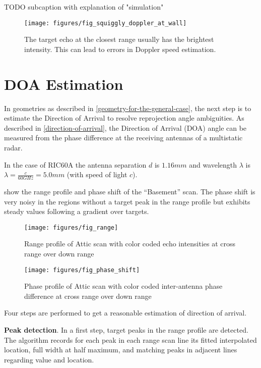 TODO subcaption with explanation of "simulation"

\begin{figure}[htbp]
    \centering
    \texttt{[image: figures/fig\_squiggly\_doppler\_at\_wall]}
    \caption{The target echo at the closest range usually has the brightest intensity. This can lead to errors in Doppler speed estimation.}
    \label{fig:fig_squiggly_doppler_at_wall}
\end{figure}

\section{DOA Estimation}\label{doa-implementation}

In geometries as described in \cref{geometry-for-the-general-case}, the next step is to estimate the Direction of Arrival to resolve reprojection angle ambiguities.
As described in \cref{direction-of-arrival}, the Direction of Arrival (DOA) angle can be measured from the phase difference at the receiving antennas of a multistatic radar.

In the case of RIC60A the antenna separation \(d\) is \(1.16mm\) and
wavelength \(\lambda\) is \(\lambda=\frac{c}{60GHz}=5.0mm\) (with speed
of light \(c\)).

 show the range profile and phase shift of the
``Basement'' scan. The phase shift is very noisy in the regions without
a target peak in the range profile but exhibits steady values following
a gradient over targets.

\begin{figure}[htbp]
    \centering
    \texttt{[image: figures/fig\_range]}
    \caption{Range profile of Attic scan with color coded echo intensities at cross range over down range}
    \label{fig:fig_range}
\end{figure}

\begin{figure}[htbp]
    \centering
    \texttt{[image: figures/fig\_phase\_shift]}
    \caption{Phase profile of Attic scan with color coded inter-antenna phase difference at cross range over down range}
    \label{fig:fig_phase_shift}
\end{figure}

Four steps are performed to get a reasonable estimation of direction of
arrival.

\textbf{Peak detection}. In a first step, target peaks in the
range profile are detected. The algorithm records for each peak in each
range scan line its fitted interpolated location, full width at half
maximum, and matching peaks in adjacent lines regarding value and
location.

